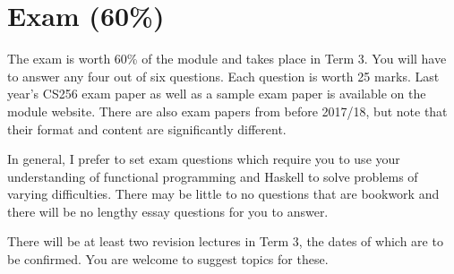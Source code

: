 \section{Exam (60\%)}

The exam is worth 60\% of the module and takes place in Term 3. You will have to answer any four out of six questions. Each question is worth 25 marks. Last year's CS256 exam paper as well as a sample exam paper is available on the module website. There are also exam papers from before 2017/18, but note that their format and content are significantly different.

In general, I prefer to set exam questions which require you to use your understanding of functional programming and Haskell to solve problems of varying difficulties. There may be little to no questions that are bookwork and there will be no lengthy essay questions for you to answer.

There will be at least two revision lectures in Term 3, the dates of which are to be confirmed. You are welcome to suggest topics for these.